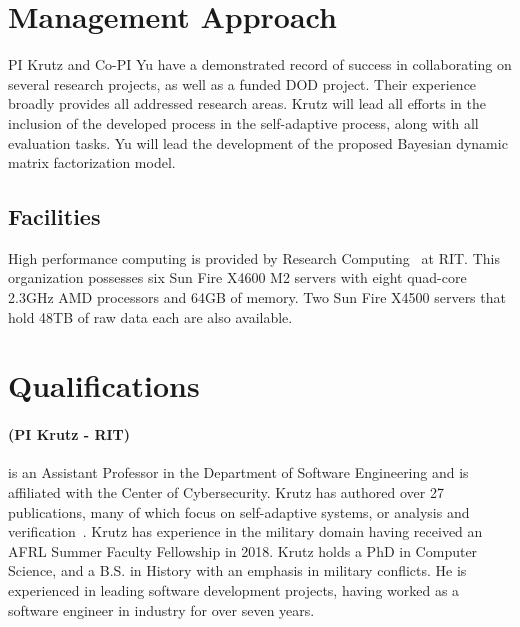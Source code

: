 \documentclass[12pt]{article}
\begin{document}
\vspace{-5mm}
\section{Management Approach}
PI Krutz and Co-PI Yu have a demonstrated record of success in collaborating on several research projects, as well as a funded DOD project. Their experience broadly provides all addressed research areas. Krutz will lead all efforts in the inclusion of the developed process in the self-adaptive process, along with all evaluation tasks. Yu will lead the development of the proposed Bayesian dynamic matrix factorization model.

\subsection{Facilities}
High performance computing is provided by Research Computing~\cite{RIT_ResearchComputing_URL} at RIT. This organization possesses six Sun Fire X4600 M2 servers with eight quad-core 2.3GHz AMD processors and 64GB of memory. Two Sun Fire X4500 servers that hold 48TB of raw data each are also available.



\section{Qualifications}



\vspace{-3mm}\paragraph{(PI Krutz - RIT)}is an Assistant Professor in the Department of Software Engineering and is affiliated with the Center of Cybersecurity. Krutz has authored over 27 publications, many of which focus on self-adaptive systems, or analysis and verification~\cite{McAfee:2017:CCA:3104086.3104132, Understanding_Relationship_SEAD18,Chester:2017:MLD:3104086.3104135, Dennis:2017:PPS:3104086.3104136,krutz2015examining, krutz2013cccd, krutzThesis}. Krutz has experience in the military domain having received an AFRL Summer Faculty Fellowship in 2018. Krutz holds a PhD in Computer Science, and a B.S. in History with an emphasis in military conflicts. He is experienced in leading software development projects, having worked as a software engineer in industry for over seven years.
\end{document}
